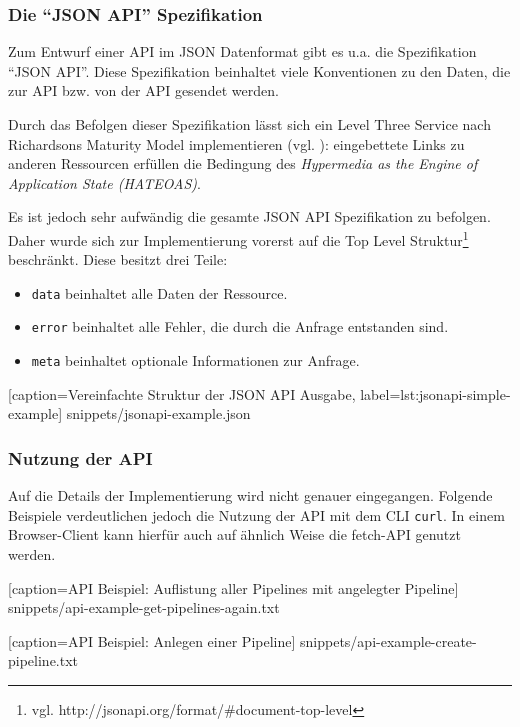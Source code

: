\subsubsection{Die ``JSON API'' Spezifikation}
\label{subsec:jsonapi}

Zum Entwurf einer API im JSON Datenformat gibt es u.a. die Spezifikation ``JSON API''. Diese Spezifikation beinhaltet viele Konventionen zu den Daten, die zur API bzw. von der API gesendet werden.

Durch das Befolgen dieser Spezifikation lässt sich ein Level Three Service nach Richardsons Maturity Model implementieren (vgl. \citep[20]{Webber2010}): eingebettete Links zu anderen Ressourcen erfüllen die Bedingung des \emph{Hypermedia as the Engine of Application State (HATEOAS)}.

Es ist jedoch sehr aufwändig die gesamte JSON API Spezifikation zu befolgen. Daher wurde sich zur Implementierung vorerst auf die Top Level Struktur\footnote{vgl. http://jsonapi.org/format/\#document-top-level} beschränkt. Diese besitzt drei Teile:

\begin{itemize}
  \item \texttt{data} beinhaltet alle Daten der Ressource.
  \item \texttt{error} beinhaltet alle Fehler, die durch die Anfrage entstanden sind.
  \item \texttt{meta} beinhaltet optionale Informationen zur Anfrage.
\end{itemize}


  [caption={Vereinfachte Struktur der JSON API Ausgabe},
  label={lst:jsonapi-simple-example}]
  {snippets/jsonapi-example.json}

\subsubsection{Nutzung der API}

Auf die Details der Implementierung wird nicht genauer eingegangen. Folgende Beispiele verdeutlichen jedoch die Nutzung der API mit dem \ac{CLI} \texttt{curl}. In einem Browser-Client kann hierfür auch auf ähnlich Weise die fetch-API genutzt werden.


  [caption={API Beispiel: Auflistung aller Pipelines mit angelegter Pipeline}]
  {snippets/api-example-get-pipelines-again.txt}


  [caption={API Beispiel: Anlegen einer Pipeline}]
  {snippets/api-example-create-pipeline.txt}

